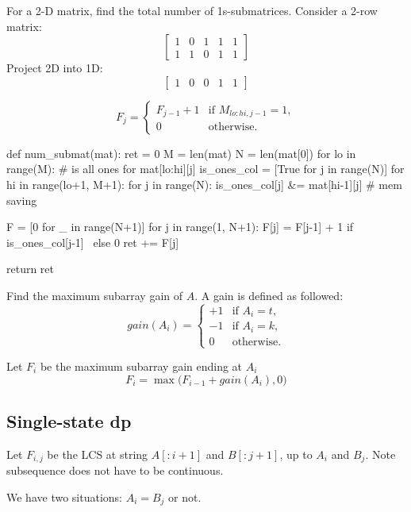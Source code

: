  For a 2-D matrix, find the total number of 1s-submatrices. Consider a 2-row matrix:
$$
\left[\begin{array}{ccccc}
1 & 0 & 1 & 1 & 1 \\
1 & 1 & 0 & 1 & 1
\end{array}\right]
$$
Project 2D into 1D:
$$
\left[\begin{array}{ccccc}
1 & 0 & 0 & 1 & 1 
\end{array}\right]
$$

\[
F_j = 
\begin{cases}
   F_{j-1} + 1 & \text{if } M_{lo:hi,j-1} = 1, \\
   0 & \text{otherwise}.
\end{cases}
\]


\begin{python}
def num_submat(mat):
    ret = 0
    M = len(mat)
    N = len(mat[0])
    for lo in range(M):
        # is all ones for mat[lo:hi][j]
        is_ones_col = [True for j in range(N)] 
        for hi in range(lo+1, M+1):
            for j in range(N):
                is_ones_col[j] &= mat[hi-1][j]
                # mem saving

            F = [0 for _ in range(N+1)]
            for j in range(1, N+1):
                F[j] = F[j-1] + 1 if is_ones_col[j-1] \
                       else 0 
                ret += F[j]
    
    return ret
\end{python}

 Find the maximum subarray gain of $A$. A gain is defined as followed:
\[
gain(A_i) = 
\begin{cases}
  +1 & \text{if } A_i = t, \\
  -1 & \text{if } A_i = k, \\
   0 & \text{otherwise}.
\end{cases}
\]


Let $F_i$  be the maximum subarray gain ending at $A_{i}$
$$
F_i = \max\Big(F_{i-1}+gain(A_{i}), 0\Big)
$$
\subsection{Single-state dp}
 Let $F_{i, j}$ be the LCS at string $A[:i+1]$ and $B[:j+1]$, up to $A_i$ and $B_j$. Note subsequence does not have to be continuous. 

We have two situations: $A_i=B_j$ or not.


